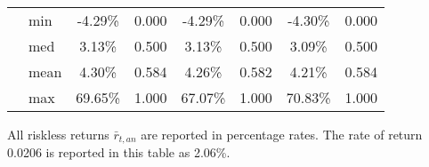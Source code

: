 \documentclass[letterpaper,12pt]{article}
\theoremstyle{definition}
\newtheorem{definition}{Definition} %
\begin{document}
\begin{spacing}{1.5}
\begin{table}[htbp]
\begin{threeparttable}
\begin{tabular}{>{\small}c >{\small}l| >{\small}c >{\small}c| >{\small}c >{\small}c| >{\small}c >{\small}c}
      & min & -4.29\% & 0.000 & -4.29\% & 0.000 & -4.30\% & 0.000 \\
      & med & 3.13\% & 0.500 & 3.13\% & 0.500 & 3.09\% & 0.500 \\
      & mean & 4.30\% & 0.584 & 4.26\% & 0.582 & 4.21\% & 0.584 \\
      & max & 69.65\% & 1.000 & 67.07\% & 1.000 & 70.83\% & 1.000 \\
      \hline\hline
    \end{tabular}
    \begin{tablenotes}
      \scriptsize{\item[]All riskless returns $\bar{r}_{t,an}$ are reported in percentage rates. The rate of return 0.0206 is reported in this table as 2.06\%.}
    \end{tablenotes}
    \end{threeparttable}
  \end{table}







\end{spacing}
\end{document}
